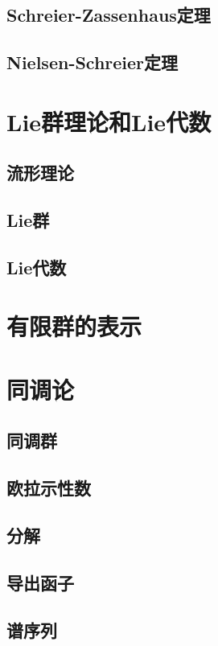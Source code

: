 \documentclass[../main.tex]{subfiles}
\begin{document}
\subsection{Schreier-Zassenhaus定理}
\subsection{Nielsen-Schreier定理}
\section{Lie群理论和Lie代数}
\subsection{流形理论}
\subsection{Lie群}
\subsection{Lie代数}
\section{有限群的表示}
\section{同调论}
\subsection{同调群}
\subsection{欧拉示性数}
\subsection{分解}
\subsection{导出函子}
\subsection{谱序列}
\biblio
\end{document}
